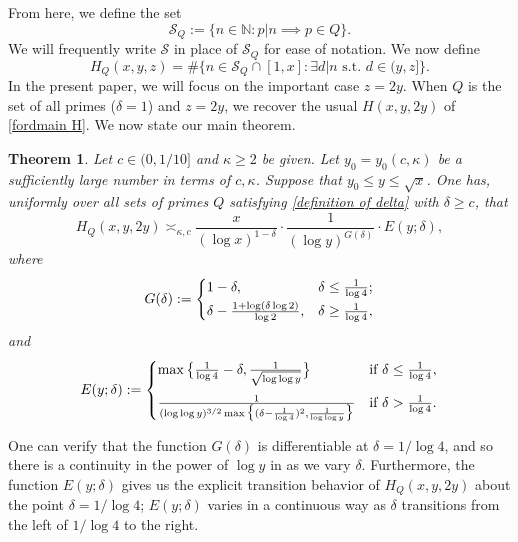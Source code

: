 \documentclass{amsart}
\newtheorem{theorem}{Theorem}[section]
\theoremstyle{definition}
\numberwithin{equation}{section}
\newcommand{\N}{\mathbb{N}}
\renewcommand{\S}{\mathcal{S}}
\newcommand{\density}{\delta}
\begin{document}
	 From here, we define the set $$\S_Q:= \{n \in \N : p|n \implies p \in Q\}.$$
	We will frequently write $\S$ in place of $\S_Q$ for ease of notation. We now define
	\begin{equation*}
		H_Q(x,y,z) = \#\{n \in \S_Q\cap[1,x]: \exists d|n\text{ s.t. }d\in (y,z]\}.
	\end{equation*}
	In the present paper, we will focus on the important case $z=2y$. When $Q$ is the set of all primes ($\density = 1$) and $z=2y$, we recover the usual $H(x,y,2y)$ of \eqref{fordmain H}. We now state our main theorem. 
	\begin{theorem} \label{mainthm}
		Let $c \in (0,1/10]$ and $\kappa \ge 2$ be given. Let $y_0=y_0(c,\kappa)$ be a sufficiently large number in terms of $c,\kappa$. Suppose that ${y_0 \leq y \leq \sqrt{x}}$. One has, uniformly over all sets of primes $Q$ satisfying \eqref{definition of delta} with $\delta \ge c$, that
		\begin{equation}
			H_Q(x,y,2y) \asymp_{\kappa,c} \frac{x}{(\log x)^{1-\density}} \cdot \frac{1}{(\log y)^{G(\density)}} \cdot E(y;\density),
		\end{equation}
		where $$G(\density) := \begin{cases}
			1-\density, \quad &\density \leq \frac{1}{\log 4};\\
			\noalign{\vskip-12pt}\\
			\density -  \frac{1+\log(\density \log 2)}{\log 2}, & \density \geq \frac{1}{\log 4},
		\end{cases}$$
		and
		$$E(y;\density) := \begin{cases}
			\max\big\{\frac{1}{\log 4} - \density, \frac{1}{\sqrt{\log \log y}}\big\} & \text{if } \density \leq \frac{1}{\log 4}, \\
			\noalign{\vskip 5pt}
			\frac{1}{(\log \log y)^{3/2} \max\big\{(\density - \frac{1}{\log 4})^2, \frac{1}{\log \log y}\big\}} & \text{if } \density > \frac{1}{\log 4}.
		\end{cases}$$
	\end{theorem}
		One can verify that the function $G(\delta)$ is differentiable at $\delta = 1/\log 4$, and so there is a continuity in the power of $\log y$ in  as we vary $\density$. Furthermore, the function $E(y;\density)$ gives us the explicit transition behavior of $H_Q(x,y,2y)$ about the point $\density = 1/\log 4$; $E(y;\density)$ varies in a continuous way as $\density$ transitions from the left of $1/\log 4$ to the right.
		
\end{document}

